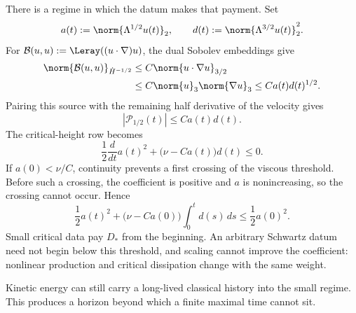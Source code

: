 There is a regime in which the datum makes that payment.  Set
\[
  a(t):=\norm{\Lambda^{1/2}u(t)}_2,
  \qquad
  d(t):=\norm{\Lambda^{3/2}u(t)}_2^2.
\]
For \(\mathcal B(u,u):=\Leray((u\cdot\nabla)u)\), the dual Sobolev embeddings
give
\begin{align}
  \norm{\mathcal B(u,u)}_{\dot H^{-1/2}}
  &\leq C\norm{u\cdot\nabla u}_{3/2}
  \notag\\
  &\leq C\norm{u}_3\norm{\nabla u}_3
  \leq C a(t)d(t)^{1/2}.
  \label{eq:BodyCriticalNonlinearDualEstimate}
\end{align}
Pairing this source with the remaining half derivative of the velocity gives
\begin{equation}\label{eq:BodyCriticalProductionAbsoluteEstimate}
  |\mathcal P_{1/2}(t)|
  \leq C a(t)d(t).
\end{equation}
The critical-height row becomes
\begin{equation}\label{eq:BodySmallCriticalDataAbsorption}
  \frac12\frac d{dt}a(t)^2
  +\bigl(\nu-Ca(t)\bigr)d(t)
  \leq0.
\end{equation}
If \(a(0)<\nu/C\), continuity prevents a first crossing of the viscous
threshold.  Before such a crossing, the coefficient is positive and \(a\) is
nonincreasing, so the crossing cannot occur.  Hence
\begin{equation}\label{eq:BodySmallCriticalDataDissipation}
  \frac12a(t)^2
  +\bigl(\nu-Ca(0)\bigr)\int_0^t d(s)\,ds
  \leq\frac12a(0)^2.
\end{equation}
Small critical data pay \(D_*\) from the beginning.  An arbitrary Schwartz
datum need not begin below this threshold, and scaling cannot improve the
coefficient: nonlinear production and critical dissipation change with the
same weight.

Kinetic energy can still carry a long-lived classical history into the small
regime.  This produces a horizon beyond which a finite maximal time cannot
sit.

